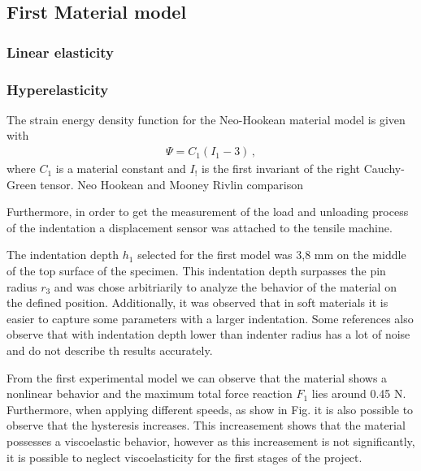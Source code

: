 \subsection{First Material model}

\subsubsection{Linear elasticity}


\subsubsection{Hyperelasticity}
The strain energy density function for the Neo-Hookean material model is given with
\begin{align*}
            \Psi = C_1 (I_1 - 3) \, ,
\end{align*}
where $C_1$ is a material constant and $I_!$ is the first invariant of the right Cauchy-Green tensor. 
Neo Hookean and Mooney Rivlin comparison






Furthermore, in order to get the measurement of the load and 
 unloading process of
 the indentation a displacement sensor was attached to the tensile machine.

 The indentation depth \(h_1\) selected for the first model was 3,8 mm on the middle of the 
 top surface of the specimen. This indentation depth surpasses the pin radius \(r_3\) and 
 was chose arbitriarily to analyze the behavior of the material on the defined position.
 Additionally, it was observed that in soft materials it is easier to capture 
 some parameters with a larger indentation. Some references also observe that with
 indentation depth lower than indenter radius has a lot of noise and do not describe
 th results accurately. %

 From the first experimental model we can observe that the material shows a nonlinear 
 behavior and the maximum total force reaction \(F_1\) lies around 0.45 N. %
 Furthermore, when applying different speeds, as show in Fig. %
 it is also possible to observe that 
 the hysteresis increases. %
This increasement shows that the material possesses a viscoelastic behavior, however
as this increasement is not significantly, it is possible to neglect viscoelasticity for 
the first stages of the project.


